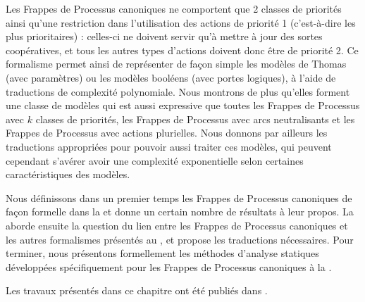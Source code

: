 Les Frappes de Processus canoniques
ne comportent que 2 classes de priorités ainsi qu'une restriction dans
l'utilisation des actions de priorité 1 (c'est-à-dire les plus prioritaires) :
celles-ci ne doivent servir qu'à mettre à jour des sortes coopératives,
et tous les autres types d'actions doivent donc être de priorité 2.
Ce formalisme permet ainsi de représenter de façon simple les modèles de Thomas (avec paramètres)
ou les modèles booléens (avec portes logiques),
à l'aide de traductions de complexité polynomiale.
Nous montrons de plus qu'elles forment une classe de modèles qui est aussi expressive
que toutes les Frappes de Processus avec $k$ classes de priorités,
les Frappes de Processus avec arcs neutralisants
et les Frappes de Processus avec actions plurielles.
Nous donnons par ailleurs les traductions appropriées pour pouvoir aussi traiter ces modèles,
qui peuvent cependant s'avérer avoir une complexité exponentielle
selon certaines caractéristiques des modèles.

\myskip

Nous définissons dans un premier temps les Frappes de Processus canoniques
de façon formelle dans la 
et donne un certain nombre de résultats à leur propos.
La  aborde ensuite
la question du lien entre les Frappes de Processus canoniques
et les autres formalismes présentés au ,
et propose les traductions nécessaires.
Pour terminer, nous présentons formellement
les méthodes d'analyse statiques développées spécifiquement
pour les Frappes de Processus canoniques à la .

Les travaux présentés dans ce chapitre ont été publiés dans
\cite*{FPMR13-CS2Bio}.

\vfill

% 






